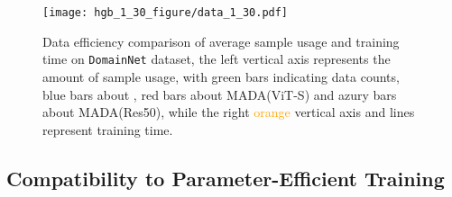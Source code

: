 



\begin{figure}[htbp]
    \centering
    \texttt{[image: hgb\_1\_30\_figure/data\_1\_30.pdf]}
    \caption{Data efficiency comparison of average sample usage and training time on \texttt{DomainNet} dataset, the left vertical axis represents the amount of sample usage, with \textcolor{allsources}{green} bars indicating \allsource{} data counts, \textcolor{ours}{blue} bars about \ourmethod{}, \textcolor{MADAvits}{red} bars about MADA(ViT-S) and \textcolor{MADAres50}{azury} bars about MADA(Res50), while the right \textcolor{orange}{orange} vertical axis and lines represent training time. }
    \label{fig:train_efficiency}
\end{figure}


\subsection{
Compatibility to Parameter-Efficient Training}

